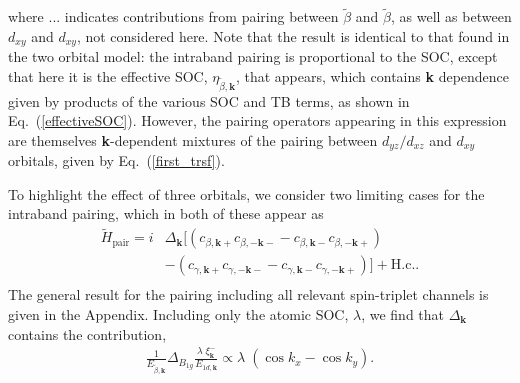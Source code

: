 \documentclass[%
reprint,
superscriptaddress,
 amsmath,amssymb,
 aps,
prb,
nobalancelastpage,
]{revtex4-2}
\begin{document}
where $...$ indicates contributions from pairing between $\widetilde{\beta}$ and $\widetilde{\beta}$, as well as between $d_{xy}$ and $d_{xy}$, not considered here. Note that the result is identical to that found in the two orbital model: the intraband pairing is proportional to the SOC, except that here it is the effective SOC, $\eta_{\widetilde{\beta},\textbf{k}}$, that appears, which contains \textbf{k} dependence given by products of the various SOC and TB terms, as shown in Eq.~(\ref{effectiveSOC}). However, the pairing operators appearing in this expression are themselves \textbf{k}-dependent mixtures of the pairing between $d_{yz}/d_{xz}$ and $d_{xy}$ orbitals, given by Eq.~(\ref{first_trsf}).


To highlight the effect of three orbitals, we consider two limiting cases for the intraband pairing, which in both of these appear as
\begin{equation}    \label{pair_brief}
\begin{aligned}
    \widetilde{H}_{\text{pair}} = i&\Delta_{\textbf{k}}\bigl[(c_{\beta,\textbf{k}+}c_{\beta,-\textbf{k}-} -c_{\beta,\textbf{k}-}c_{\beta,-\textbf{k}+}) \\[6pt]&- (c_{\gamma,\textbf{k}+}c_{\gamma,-\textbf{k}-} -c_{\gamma,\textbf{k}-}c_{\gamma,-\textbf{k}+})\bigr] + \text{H.c.}.\\[6pt]
\end{aligned}
\end{equation}
The general result for the pairing including all relevant spin-triplet channels is given in the Appendix.  Including only the atomic SOC, $\lambda$, we find that $\Delta_{\textbf{k}}$ contains the contribution, 
\begin{equation}
\label{expectation_atomic}
\begin{aligned}
      \frac{1}{E_{\widetilde{\beta},\textbf{k}}}{\Delta_{B_{1g}}}{\frac{{\lambda\;\xi_{\textbf{k}}^{-}}}{E_{1d,\textbf{k}}}} \propto \lambda\;(\cos{k_x}-\cos{k_y}).
\end{aligned}
\end{equation}
\end{document}
